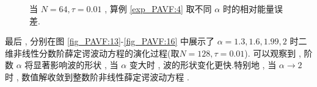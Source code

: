 	\vspace{-0.5mm}
	\begin{figure}[H]
	\begin{center}
	  
	\vspace{-1.5mm}
	\caption{当  $N = 64 , \tau=0.01$ , 算例 \ref{exp_PAVF:4} 取不同 $\alpha$ 时的相对能量误差.}
	\label{fig_PAVF:12}
	\end{center}
	\end{figure}
	
	最后 , 分别在图 \ref{fig_PAVF:13}-\ref{fig_PAVF:16} 中展示了 $\alpha=1.3 , 1.6 , 1.99 , 2$ 时二维非线性分数阶薛定谔波动方程的演化过程(取$N=128 , \tau=0.01$).
	可以观察到 , 阶数 $\alpha$ 将显著影响波的形状 , 当 $\alpha$ 变大时 , 波的形状变化更快.特别地 , 当 $\alpha \rightarrow 2$ 时 , 
	数值解收敛到整数阶非线性薛定谔波动方程 \cite{zhangConservativeNumericalScheme2003,liCompactFiniteDifference2012,wangAnalysisNewConservative2006}.

